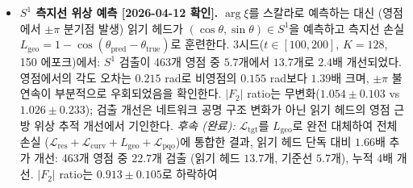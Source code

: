 \documentclass[11pt, a4paper]{article}
\theoremstyle{definition}
\theoremstyle{plain}
\newcommand{\xif}{\xi}
\newcommand{\Lpqo}{\mathcal{L}_{\mathrm{pqo}}}
\newcommand{\Ltgt}{\mathcal{L}_{\mathrm{tgt}}}
\newcommand{\Lcurv}{\mathcal{L}_{\mathrm{curv}}}
\newcommand{\Lres}{\mathcal{L}_{\mathrm{res}}}
\begin{document}
\begin{itemize}
        한편 원거리장 곡률 분산
        $\mathrm{Var}[R_{\mathrm{far}}]$은 유한하며,
        GUE linear statistic CLT(Johansson 1998)에서
        $f(x)=x^{-2}\mathbf{1}_{|x|\ge 1}$의 푸리에 변환을 통해
        $V_{\mathrm{GUE}}(1)=0.2161$로 예측된다.
        다중 차수 보편성이 확인되었다:
        $\zeta(s)$ 3900영점 $0.961$,
        Dirichlet $\chi_3$ mod~3 ($0.846$),
        $\chi_4$ mod~4 ($0.868$),
        $\chi_5$ mod~5 ($1.121$, 복소 캐릭터),
        GL(2) EC~11a1 ($1.003$, PARI 교정 233영점).
        5개 $L$-함수 모두 $[0.85,\,1.12]$ 범위 내 통과 (degree~1--2 보편성).
        기존 \texttt{mpmath} 기반 GL(2) 캐시(86영점, 비율 $0.235$)는
        부정확하여 PARI/GP로 교정하였다 (평균 unfolded 간격 $0.997$).
        $a=0.5$에서 GL(2) 비율이 $0.439$로 하락하여,
        작은 cutoff에서의 $a$-의존성은 미결 문제이다.
        이는 Prop.~\ref{prop:gue_enhancement}($\eta=2$, 1차 모멘트)의
        2차 모멘트 동반 결과이다.
        [2026-06-23 확인; C-471/C-480; degree 1--2 보편성 5/5 PASS; GL(2) PARI 교정]
        임계선 커버리지: $\{\tfrac{1}{2}, 1, \tfrac{3}{2}, 2, \tfrac{5}{2}, 6\}$ (6종).
        구성 경로: GL(1) Dirichlet, GL(2) EC/Maass/$\Delta$, GL(3)--GL(5) sym$^k$, Dedekind zeta, Artin $L(s,\rho_2)$ ($S_3$), Artin $L(s,\rho_3)$ ($A_4$), Rankin--Selberg $L(f \otimes g)$ (10종).
        [2026-06-23 갱신; 13개 $L$-함수, degree 1--5; Var[$\kappa_{\mathrm{far}}$] degree 1--2 보편성 5/5 PASS]
  \item \textbf{$S^1$ 측지선 위상 예측
        [2026-04-12 확인].}
        $\arg\xif$를 스칼라로 예측하는 대신 (영점에서 $\pm\pi$
        분기점 발생) 읽기 헤드가
        $(\cos\theta,\sin\theta)\in S^1$을 예측하고 측지선 손실
        $L_{\mathrm{geo}}=1-\cos(\theta_{\mathrm{pred}}-
        \theta_{\mathrm{true}})$로 훈련한다.
        3시드($t\in[100,200]$, $K=128$, 150 에포크)에서:
        $S^1$ 검출이 463개 영점 중 $5.7$개에서 $13.7$개로
        $2.4$배 개선되었다. 영점에서의 각도 오차는 $0.215$ rad로
        비영점의 $0.155$ rad보다 $1.39$배 크며, $\pm\pi$ 불연속이
        부분적으로 우회되었음을 확인한다.
        $|F_2|$ ratio는 무변화($1.054\pm0.103$ vs $1.026\pm0.233$);
        검출 개선은 네트워크 공명 구조 변화가 아닌 읽기 헤드의
        영점 근방 위상 추적 개선에서 기인한다.
        \emph{후속 (완료):} $\Ltgt$를 $L_{\mathrm{geo}}$로 완전
        대체하여 전체 손실
        ($\Lres+\Lcurv+L_{\mathrm{geo}}+\Lpqo$)에 통합한 결과,
        읽기 헤드 단독 대비 $1.66$배 추가 개선:
        463개 영점 중 $22.7$개 검출 (읽기 헤드 $13.7$개,
        기준선 $5.7$개), 누적 $4$배 개선.
        $|F_2|$ ratio는 $0.913\pm0.105$로 하락하여

\end{itemize}
\end{document}
